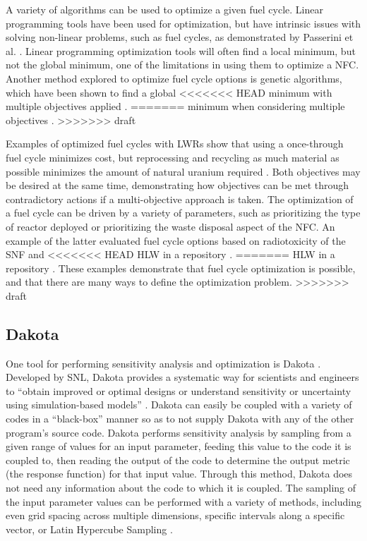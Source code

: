 A variety of algorithms can be used to optimize a given 
fuel cycle. Linear programming tools have been used for 
optimization, but have intrinsic issues with solving non-linear 
problems, such as fuel cycles, as demonstrated by 
Passerini et al. \cite{passerini_systematic_2014}.
Linear programming optimization tools will often find a local minimum, 
but not the global minimum, one of the limitations in using them 
to optimize a \gls{NFC}. Another method explored to optimize fuel cycle 
options is genetic algorithms, which have been shown to find a global 
<<<<<<< HEAD
minimum with multiple objectives applied \cite{passerini_systematic_2014}. 
=======
minimum when considering multiple objectives \cite{passerini_systematic_2014}. 
>>>>>>> draft

Examples of optimized fuel cycles with \glspl{LWR} show that using a
once-through fuel cycle minimizes cost, but reprocessing and recycling as 
much material as possible minimizes the amount of natural uranium 
required \cite{kunsch_nuclear_1987}. Both objectives may 
be desired at the same time, demonstrating how 
objectives can be met through contradictory actions if a multi-objective 
approach is taken. The optimization of a fuel cycle can be driven 
by a variety of parameters, such as prioritizing the type of reactor 
deployed or prioritizing the waste disposal 
aspect of the \gls{NFC}. An example of the latter 
evaluated fuel cycle options based on radiotoxicity of the \gls{SNF} and 
<<<<<<< HEAD
\gls{HLW} in a repository \cite{del_cul_advanced_2010}. 
=======
\gls{HLW} in a repository \cite{del_cul_advanced_2010}. These examples 
demonstrate that fuel cycle optimization is possible, and that there 
are many ways to define the optimization problem. 
>>>>>>> draft

\subsection{Dakota}
One tool for performing sensitivity analysis and optimization is 
Dakota \cite{adams_dakota_2021}. Developed by \gls{SNL}, Dakota provides 
a systematic way for scientists and 
engineers to ``obtain improved or optimal designs or understand sensitivity
or uncertainty using simulation-based models'' \cite{adams_dakota_2021}.
Dakota can easily be coupled with a variety of codes in a ``black-box'' 
manner so as to not supply Dakota with any of the other program's source code.
Dakota performs sensitivity analysis by sampling from a given range of 
values for an input parameter, feeding this value to the code it is 
coupled to, then reading the output of the code to determine the output 
metric (the response function) for that input value. Through this method, 
Dakota does not need any information about the code to which it is coupled. 
The sampling of the input parameter values can be performed with a variety of 
methods, including even grid spacing across multiple dimensions, specific 
intervals along a specific vector, or Latin Hypercube Sampling 
\cite{adams_dakota_2021}.

